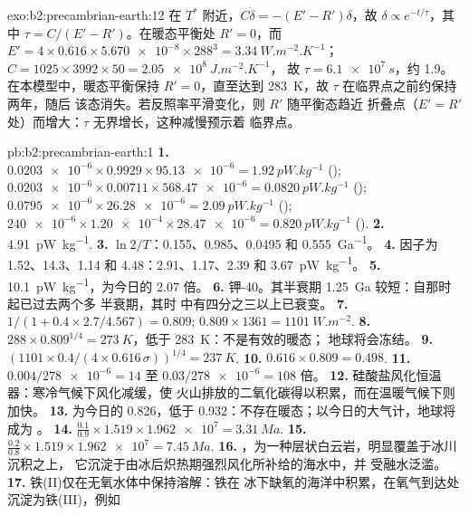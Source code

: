 \begin{solution}{exo:b2:precambrian-earth:12}
在 $T^*$ 附近，$C\dot\delta = -(E' - R')\delta$，故 $\delta \propto e^{-t/\tau}$，其中 $\tau =
C/(E' - R')$。在暖态平衡处 $R' = 0$，而 $E' = 4\times0.616\times\num{5.670e-8}\times
288^3 = \qty{3.34}{W.m^{-2}.K^{-1}}$；$C = 1025\times3992\times50 = \qty{2.05e8}{J.m^{-2}.K^{-1}}$，
故 $\tau = \qty{6.1e7}{s}$，约 \qty{1.9}{}。在本模型中，暖态平衡保持 $R' =
0$，直至达到 \qty{283}{K}，故 $\tau$ 在临界点之前约保持两年，随后
该态消失。若反照率平滑变化，则 $R'$ 随平衡态趋近
折叠点（$E' = R'$ 处）而增大：$\tau$ 无界增长，这种减慢预示着
临界点。
\end{solution}

\begin{solution}{pb:b2:precambrian-earth:1}
\textbf{1.} $\num{0.0203e-6}\times0.9929\times\num{95.13e-6} = \qty{1.92}{pW.kg^{-1}}$
(); $\num{0.0203e-6}\times0.00711\times\num{568.47e-6} = \qty{0.0820}{pW.kg^{-1}}$
(); $\num{0.0795e-6}\times\num{26.28e-6} = \qty{2.09}{pW.kg^{-1}}$ ();
$\num{240e-6}\times\num{1.20e-4}\times\num{28.47e-6} = \qty{0.820}{pW.kg^{-1}}$ ().
\textbf{2.} \qty{4.91}{pW.kg^{-1}}.
\textbf{3.} $\ln2/T$：0.155、0.985、0.0495 和 \qty{0.555}{Ga^{-1}}。
\textbf{4.} 因子为 1.52、14.3、1.14 和 4.48：2.91、1.17、2.39 和 \qty{3.67}{pW.kg^{-1}}。
\textbf{5.} \qty{10.1}{pW.kg^{-1}}，为今日的 2.07 倍。
\textbf{6.} 钾-40。其半衰期 \qty{1.25}{Ga} 较短：自那时起已过去两个多
半衰期，其时  中有四分之三以上已衰变。
\textbf{7.} $1/(1 + 0.4\times2.7/4.567) = 0.809$; $0.809\times1361 = \qty{1101}{W.m^{-2}}$.
\textbf{8.} $288\times0.809^{1/4} = \qty{273}{K}$，低于 \qty{283}{K}：不是有效的暖态；
地球将会冻结。
\textbf{9.} $(1101\times0.4/(4\times0.616\,\sigma))^{1/4} = \qty{237}{K}$.
\textbf{10.} $0.616\times0.809 = 0.498$.
\textbf{11.} $0.004/\num{278e-6} = 14$ 至 $0.03/\num{278e-6} = 108$ 倍。
\textbf{12.} 硅酸盐风化恒温器：寒冷气候下风化减缓，使
火山排放的二氧化碳得以积累，而在温暖气候下则加快。
\textbf{13.} 为今日的 0.826，低于 0.932：不存在暖态；以今日的大气计，地球将成为
。
\textbf{14.} $\frac{0.1}{0.9}\times1.519\times\num{1.962e7} = \qty{3.31}{Ma}$.
\textbf{15.} $\frac{0.2}{0.8}\times1.519\times\num{1.962e7} = \qty{7.45}{Ma}$.
\textbf{16.} ，为一种层状白云岩，明显覆盖于冰川沉积之上，
它沉淀于由冰后炽热期强烈风化所补给的海水中，并
受融水泛滥。
\textbf{17.} 铁(II)仅在无氧水体中保持溶解：铁在
冰下缺氧的海洋中积累，在氧气到达处沉淀为铁(III)，例如

\end{solution}

